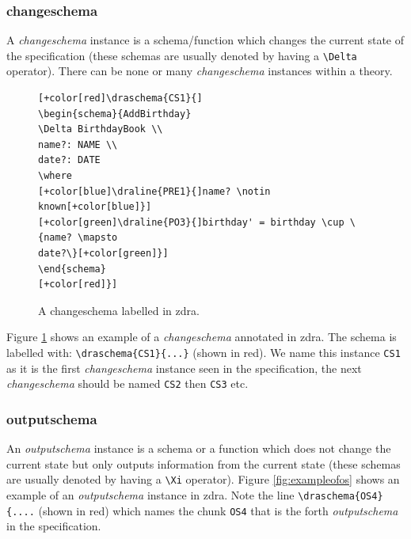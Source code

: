 \subsubsection{changeschema}

A \emph{changeschema} instance is a schema/function which changes the current
state of the specification (these schemas are usually denoted by having a
\verb|\Delta| operator). There can be none or many \emph{changeschema} instances
within a theory.

\begin{center}
\begin{figure}[H]
\centering
\begin{footnotesize}
\begin{BVerbatim}[commandchars=+\[\]]
[+color[red]\draschema{CS1}{]
\begin{schema}{AddBirthday}
\Delta BirthdayBook \\
name?: NAME \\
date?: DATE
\where
[+color[blue]\draline{PRE1}{]name? \notin known[+color[blue]}]
[+color[green]\draline{PO3}{]birthday' = birthday \cup \{name? \mapsto
date?\}[+color[green]}]
\end{schema}
[+color[red]}]
\end{BVerbatim}
\end{footnotesize}
\caption{\label{fig:exampleofcs} A changeschema labelled in \gls{zdra}.}
\end{figure}
\end{center}

Figure \ref{fig:exampleofcs} shows an example of a \emph{changeschema} annotated
in \gls{zdra}. The schema is labelled with: \verb|\draschema{CS1}{...}| (shown
in red). We name this instance \verb|CS1| as it is the first \emph{changeschema}
instance seen in the specification, the next \emph{changeschema} should be named
\verb|CS2| then \verb|CS3| etc.

\subsubsection{outputschema}

An \emph{outputschema} instance is a schema or a function which does not change
the current state but only outputs information from the current state (these
schemas are usually denoted by having a \verb|\Xi| operator). Figure
\ref{fig:exampleofos} shows an example of an \emph{outputschema} instance in
\gls{zdra}. Note the line \verb|\draschema{OS4}{....| (shown in red) which names
the chunk \verb|OS4| that is the forth \emph{outputschema} in the specification.

